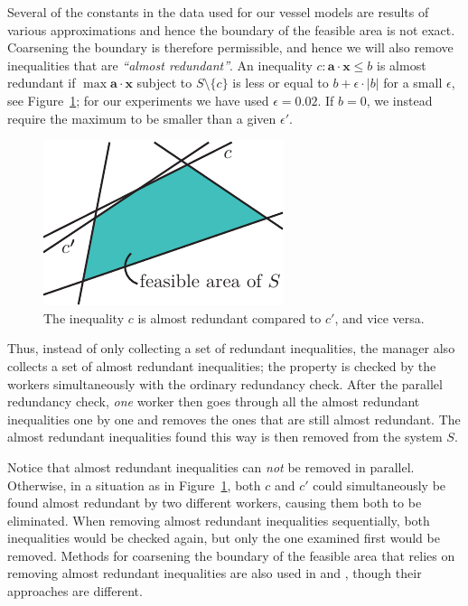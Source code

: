 \documentclass[citeauthoryear]{llncs}
\newcommand{\ve}{\mathbf}
\begin{document}
Several of the constants in the data used for our vessel models are results of various approximations and hence the boundary of the feasible area is not exact. Coarsening the boundary is therefore permissible, and hence we will also remove inequalities that are \emph{``almost redundant''}. An inequality $c: \ve{a}\cdot\ve{x}\leq b$ is almost redundant if $\max \ve{a}\cdot\ve{x}$  subject to $S\setminus\{c\}$ is less or equal to $b + \epsilon\cdot |b|$ for a small $\epsilon$, see Figure~\ref{fig:almostRedundant}; for our experiments we have used $\epsilon = 0.02$. If $b=0$, we instead require the maximum to be smaller than a given $\epsilon'$. 
\begin{figure}[htbp]
	\centering
		\includegraphics[scale=0.9]{figures/almostRedundant.pdf}
	\caption{The inequality $c$ is almost redundant compared to $c'$, and vice versa.}
	\label{fig:almostRedundant}
\end{figure}
Thus, instead of only collecting a set of redundant inequalities, the manager also collects a set of almost redundant inequalities; the property is checked by the workers simultaneously with the ordinary redundancy check. After the parallel redundancy check, \emph{one} worker then goes through all the almost redundant inequalities one by one and removes the ones that are still almost redundant. The almost redundant inequalities found this way is then removed from the system $S$.  

Notice that almost redundant inequalities can \emph{not} be removed in parallel. Otherwise, in a situation as in Figure~\ref{fig:almostRedundant}, both $c$ and $c'$ could simultaneously be found almost redundant by two different workers, causing them both to be eliminated. When removing almost redundant inequalities sequentially, both inequalities would be checked again, but only the one examined first would be removed. Methods for coarsening the boundary of the feasible area that relies on removing almost redundant inequalities are also used in \cite{lukatskii08} and \cite{shapot12}, though their approaches are different.
\end{document}
